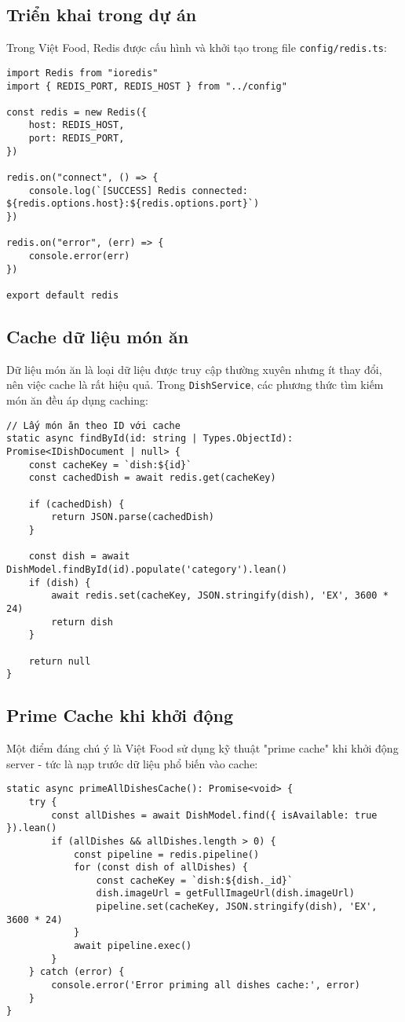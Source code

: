 \subsection{Triển khai trong dự án}
Trong Việt Food, Redis được cấu hình và khởi tạo trong file \texttt{config/redis.ts}:

\begin{verbatim}
import Redis from "ioredis"
import { REDIS_PORT, REDIS_HOST } from "../config"

const redis = new Redis({
    host: REDIS_HOST,
    port: REDIS_PORT,
})

redis.on("connect", () => {
    console.log(`[SUCCESS] Redis connected: ${redis.options.host}:${redis.options.port}`)
})

redis.on("error", (err) => {
    console.error(err)
})

export default redis
\end{verbatim}

\subsection{Cache dữ liệu món ăn}
Dữ liệu món ăn là loại dữ liệu được truy cập thường xuyên nhưng ít thay đổi, nên việc cache là rất hiệu quả. Trong \texttt{DishService}, các phương thức tìm kiếm món ăn đều áp dụng caching:

\begin{verbatim}
// Lấy món ăn theo ID với cache
static async findById(id: string | Types.ObjectId): Promise<IDishDocument | null> {
    const cacheKey = `dish:${id}`
    const cachedDish = await redis.get(cacheKey)
    
    if (cachedDish) {
        return JSON.parse(cachedDish)
    }
    
    const dish = await DishModel.findById(id).populate('category').lean()
    if (dish) {
        await redis.set(cacheKey, JSON.stringify(dish), 'EX', 3600 * 24)
        return dish
    }
    
    return null
}
\end{verbatim}

\subsection{Prime Cache khi khởi động}
Một điểm đáng chú ý là Việt Food sử dụng kỹ thuật "prime cache" khi khởi động server - tức là nạp trước dữ liệu phổ biến vào cache:

\begin{verbatim}
static async primeAllDishesCache(): Promise<void> {
    try {
        const allDishes = await DishModel.find({ isAvailable: true }).lean()
        if (allDishes && allDishes.length > 0) {
            const pipeline = redis.pipeline()
            for (const dish of allDishes) {
                const cacheKey = `dish:${dish._id}`
                dish.imageUrl = getFullImageUrl(dish.imageUrl)
                pipeline.set(cacheKey, JSON.stringify(dish), 'EX', 3600 * 24)
            }
            await pipeline.exec()
        }
    } catch (error) {
        console.error('Error priming all dishes cache:', error)
    }
}
\end{verbatim}

